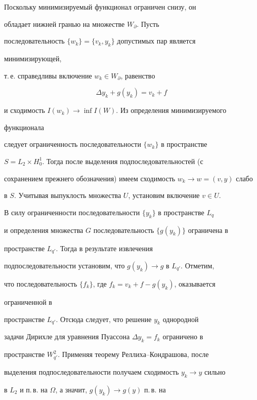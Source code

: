 \begin{pf} 


Поскольку минимизируемый функционал ограничен снизу, он 


обладает нижней гранью на множестве $W_\partial$. Пусть 


последовательность $\{w_k\}=\{v_k,y_k\}$ допустимых пар является 


минимизирующей, 


т.\,е. справедливы включение $w_k\in W_\partial$, равенство 


\begin{equation} 


\Delta y_k+g(y_k)=v_k+f 


\end{equation} 


и сходимость $I(w_k)\to\inf I(W)$. Из определения минимизируемого 


функционала 


следует ограниченность последовательности $\{w_k\}$ в пространстве 


$S=L_2\times H^1_0$. Тогда после выделения подпоследовательностей (с 


сохранением прежнего обозначения) имеем сходимость $w_k\to w=(v,y)$ слабо 


в $S$. Учитывая выпуклость множества $U$, установим включение $v\in U$. 


В силу ограниченности последовательности $\{y_k\}$ в пространстве $L_q$ 


и определения множества $G$ последовательность $\{g(y_k)\}$ ограничена в 


пространстве $L_{q'}$. Тогда в результате извлечения 


подпоследовательности установим, что $g(y_k)\to g$ в $L_{q'}$. Отметим, 


что последовательность $\{f_k\}$, где $f_k=v_k+f-g(y_k)$, оказывается 


ограниченной в 


пространстве $L_{q'}$. Отсюда следует, что решение $y_k$ однородной 


задачи Дирихле для уравнения Пуассона $\Delta y_k=f_k$ ограничено в 


пространстве $W^2_{q'}$. Применяя теорему Реллиха--Кондрашова, после 


выделения подпоследовательности получаем сходимость $y_k\to y$ сильно 


в $L_2$ и п.\,в. на $\Omega$, а значит, $g(y_k)\to g(y)$ п.\,в. на 



\end{pf}
